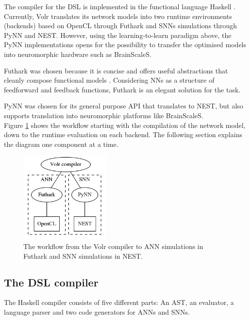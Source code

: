 The compiler for the \gls{DSL} is implemented in the functional language
Haskell \cite{Haskell}.
Currently, Volr translates its network models into two runtime
environments (backends) based on \gls{OpenCL} through Futhark and
\glspl{SNN} simulations through PyNN and NEST.
However, using the learning-to-learn paradigm above, the PyNN implementations
opens for the possibility to transfer the optimised models into neuromorphic
hardware such as BrainScaleS.

Futhark was chosen because it is concise and offers
useful abstractions that cleanly compose functional
models \cite{Henriksen2017}.
Considering \glspl{NN} as a structure of feedforward and feedback functions,
Futhark is an elegant solution for the task.

PyNN was chosen for its general purpose API that translates to NEST, but also
supports translation into neuromorphic platforms like BrainScaleS.  
\\[0.2cm]
Figure \ref{fig:volr-architecture} shows the workflow starting with the
compilation of the network model, down to the runtime evaluation on each backend.
The following section explains the diagram one component at a time.

\begin{figure}
  \centering
  \includegraphics[width=0.4\textwidth]{images/volr-architecture.png}
  \caption{The workflow from the Volr compiler to 
    \gls{ANN} simulations in Futhark and \gls{SNN} simulations in NEST.
  }
  \label{fig:volr-architecture}
\end{figure}

\subsection{The DSL compiler}
The Haskell compiler consists of five different parts:
An \gls{AST}, an evaluator, a language parser and two
code generators for \glspl{ANN} and \glspl{SNN}.

